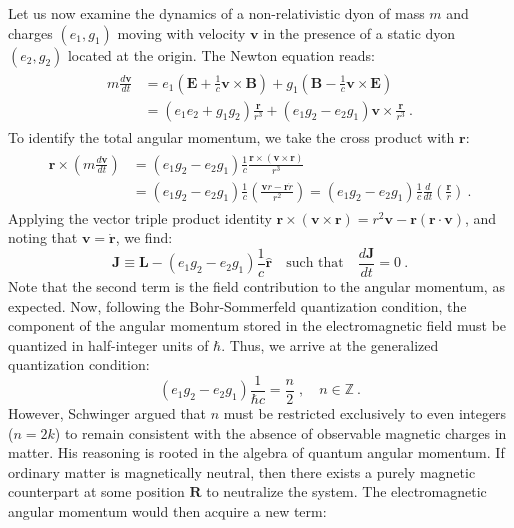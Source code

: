 \documentclass[a4paper,11pt]{article}
\begin{document}
Let us now examine the dynamics of a non-relativistic dyon of mass $m$ and charges $(e_1, g_1)$ moving with velocity $\boldsymbol{v}$ in the presence of a static dyon $(e_2, g_2)$ located at the origin. The Newton equation reads:
\begin{align}
    \begin{split}
         m \frac{d\boldsymbol{v}}{dt} &= e_1 (\boldsymbol{E} + \frac{1}{c}\boldsymbol{v} \times \boldsymbol{B}) + g_1 (\boldsymbol{B} - \frac{1}{c}\boldsymbol{v} \times \boldsymbol{E})\\
         &= (e_1 e_2 + g_1 g_2) \frac{\boldsymbol{r}}{r^3} + (e_1 g_2 - e_2 g_1) \boldsymbol{v} \times \frac{\boldsymbol{r}}{r^3}\ .
    \end{split}
\end{align}
To identify the total angular momentum, we take the cross product with $\boldsymbol{r}$:
\begin{align}
    \begin{split}
  \boldsymbol{r} \times \left( m \frac{d\boldsymbol{v}}{dt} \right) &= (e_1 g_2 - e_2 g_1) \frac{1}{c}\frac{\boldsymbol{r} \times (\boldsymbol{v} \times \boldsymbol{r})}{r^3}\\
  &=(e_1 g_2 - e_2 g_1) \frac{1}{c}\left( \frac{\boldsymbol{v} r - \boldsymbol{r}\dot{r}}{r^2} \right)=(e_1 g_2 - e_2 g_1) \frac{1}{c}\frac{d}{dt}\left( \frac{\boldsymbol{r}}{r} \right)\ .
    \end{split}
\end{align}
Applying the vector triple product identity $\boldsymbol{r} \times (\boldsymbol{v} \times \boldsymbol{r}) = r^2 \boldsymbol{v} - \boldsymbol{r}(\boldsymbol{r} \cdot \boldsymbol{v})$, and noting that $\boldsymbol{v} = \dot{\boldsymbol{r}}$, we find:
\begin{equation}
    \boldsymbol{J} \equiv \boldsymbol{L} - (e_1 g_2 - e_2 g_1)\frac{1}{c} \hat{\boldsymbol{r}} \quad \text{such that} \quad \frac{d\boldsymbol{J}}{dt} = 0\ .
\end{equation}
Note that the second term is the field contribution to the angular momentum, as expected. Now, following the Bohr-Sommerfeld quantization condition, the component of the angular momentum stored in the electromagnetic field must be quantized in half-integer units of $\hbar$. Thus, we arrive at the generalized quantization condition:
\begin{equation}
    (e_1 g_2 - e_2 g_1) \frac{1}{\hbar c} = \frac{n}{2} \; , \quad n \in \mathbb{Z}\ .
\end{equation}
However, Schwinger argued that $n$ must be restricted exclusively to even integers ($n = 2k$) to remain consistent with the absence of observable magnetic charges in matter. His reasoning is rooted in the algebra of quantum angular momentum. If ordinary matter is magnetically neutral, then there exists a purely magnetic counterpart at some position $\boldsymbol{R}$ to neutralize the system. The electromagnetic angular momentum would then acquire a new term:
\end{document}
